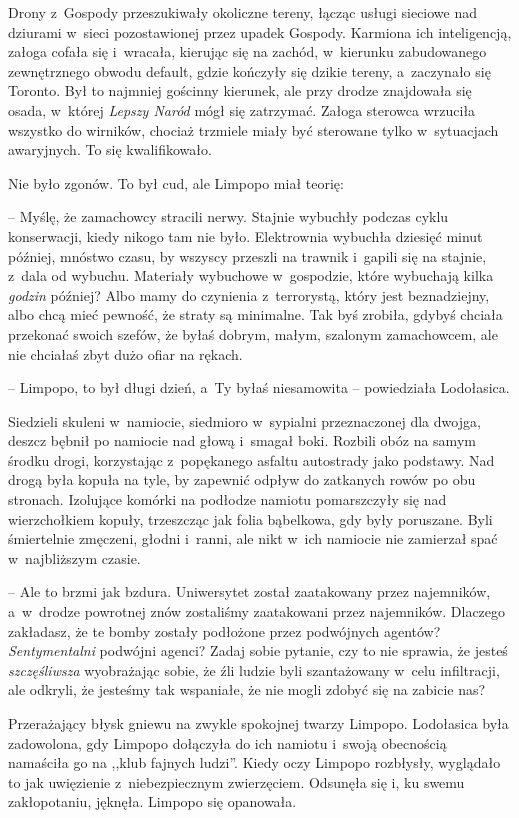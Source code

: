 \documentclass[oneside,polish,11pt,sfheadings]{mwbk}
\begin{document}
Drony z~Gospody przeszukiwały okoliczne tereny, łącząc usługi sieciowe
nad dziurami w~sieci pozostawionej przez upadek Gospody. Karmiona ich
inteligencją, załoga cofała się i~wracała, kierując się na zachód, w~kierunku zabudowanego zewnętrznego obwodu default, gdzie kończyły się
dzikie tereny, a~zaczynało się Toronto. Był to najmniej gościnny
kierunek, ale przy drodze znajdowała się osada, w~której \textit{Lepszy
Naród} mógł się zatrzymać. Załoga sterowca wrzuciła wszystko do
wirników, chociaż trzmiele miały być sterowane tylko w~sytuacjach
awaryjnych. To się kwalifikowało.

Nie było zgonów. To był cud, ale Limpopo miał teorię: 

-- Myślę, że
zamachowcy stracili nerwy. Stajnie wybuchły podczas cyklu konserwacji,
kiedy nikogo tam nie było. Elektrownia wybuchła dziesięć minut później,
mnóstwo czasu, by wszyscy przeszli na trawnik i~gapili się na stajnie, z~dala od wybuchu. Materiały wybuchowe w~gospodzie, które wybuchają kilka
\textit{godzin} później? Albo mamy do czynienia z~terrorystą, który jest
beznadziejny, albo chcą mieć pewność, że straty są minimalne. Tak byś
zrobiła, gdybyś chciała przekonać swoich szefów, że byłaś dobrym, małym,
szalonym zamachowcem, ale nie chciałaś zbyt dużo ofiar na rękach.

-- Limpopo, to był długi dzień, a~Ty byłaś niesamowita -- powiedziała
Lodołasica. 

Siedzieli skuleni w~namiocie, siedmioro w~sypialni
przeznaczonej dla dwojga, deszcz bębnił po namiocie nad głową i~smagał
boki. Rozbili obóz na samym środku drogi, korzystając z~popękanego
asfaltu autostrady jako podstawy. Nad drogą była kopuła na tyle, by
zapewnić odpływ do zatkanych rowów po obu stronach. Izolujące komórki na
podłodze namiotu pomarszczyły się nad wierzchołkiem kopuły, trzeszcząc
jak folia bąbelkowa, gdy były poruszane. Byli śmiertelnie zmęczeni,
głodni i~ranni, ale nikt w~ich namiocie nie zamierzał spać w~najbliższym
czasie.

-- Ale to brzmi jak bzdura. Uniwersytet został zaatakowany przez
najemników, a~w~drodze powrotnej znów zostaliśmy zaatakowani przez
najemników. Dlaczego zakładasz, że te bomby zostały podłożone przez
podwójnych agentów? \textit{Sentymentalni }podwójni agenci? Zadaj sobie
pytanie, czy to nie sprawia, że jesteś \textit{szczęśliwsza} wyobrażając
sobie, że źli ludzie byli szantażowany w~celu infiltracji, ale odkryli,
że jesteśmy tak wspaniałe, że nie mogli zdobyć się na zabicie nas?

Przerażający błysk gniewu na zwykle spokojnej twarzy Limpopo. Lodołasica
była zadowolona, gdy Limpopo dołączyła do ich namiotu i~swoją obecnością
namaściła go na ,,klub fajnych ludzi''. Kiedy oczy Limpopo rozbłysły,
wyglądało to jak uwięzienie z~niebezpiecznym zwierzęciem. Odsunęła się
i, ku swemu zakłopotaniu, jęknęła. Limpopo się opanowała.
\end{document}
